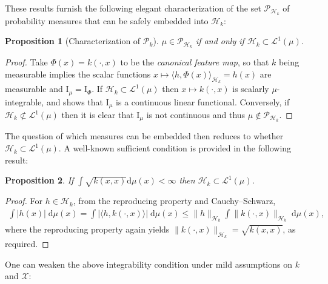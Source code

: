 \documentclass[12pt,paper=letter]{scrreprt}
\newtheorem{proposition}{Proposition}[chapter]
\begin{document}
These results furnish the following elegant characterization of the set $\mathcal{P}_{\mathcal{H}_k}$ of probability measures that can be safely embedded into $\mathcal{H}_k$:

\begin{proposition}[Characterization of $\mathcal{P}_k$]
\label{cor: embeddability in general}
$\mu \in \mathcal{P}_{\mathcal{H}_k}$ if and only if $\mathcal{H}_k \subset \mathcal{L}^1(\mu)$.
\end{proposition}
\begin{proof}
Take $\Phi(x) = k(\cdot,x)$ to be the \emph{canonical feature map}, so that $k$ being measurable implies the scalar functions $x \mapsto \langle h , \Phi(x) \rangle_{\mathcal{H}_k} = h(x)$ are measurable and $\mathrm{I}_\mu = \mathrm{I}_\Phi$.
If $\mathcal{H}_k \subset \mathcal{L}^1(\mu)$ then $x \mapsto k(\cdot,x)$ is scalarly $\mu$-integrable, and  shows that $\mathrm{I}_\mu$ is a continuous linear functional.
Conversely, if $\mathcal{H}_k \not\subset \mathcal{L}^1(\mu)$ then it is clear that $\mathrm{I}_\mu$ is not continuous and thus $\mu \notin \mathcal{P}_{\mathcal{H}_k}$.
\end{proof}

\noindent The question of which measures can be embedded then reduces to whether $\mathcal{H}_k \subset \mathcal{L}^1(\mu)$.
A well-known sufficient condition is provided in the following result:

\begin{proposition}
\label{prop: sufficient for embed}
If $\int \sqrt{k(x,x)} \mathrm{d}\mu(x) < \infty$ then $\mathcal{H}_k \subset \mathcal{L}^1(\mu)$.
\end{proposition}
\begin{proof}
For $h \in \mathcal{H}_k$, from the reproducing property and Cauchy--Schwarz,
\begin{align*}
\int |h(x)| \; \mathrm{d}\mu(x) = \int |\langle h , k(\cdot,x) \rangle | \; \mathrm{d}\mu(x) \leq \|h\|_{\mathcal{H}_k} \int \|k(\cdot,x)\|_{\mathcal{H}_k} \; \mathrm{d}\mu(x) ,
\end{align*}
where the reproducing property again yields $\|k(\cdot,x)\|_{\mathcal{H}_k} = \sqrt{k(x,x)}$, as required.
\end{proof}

\noindent One can weaken the above integrability condition under mild assumptions on $k$ and $\mathcal{X}$: 
\end{document}
